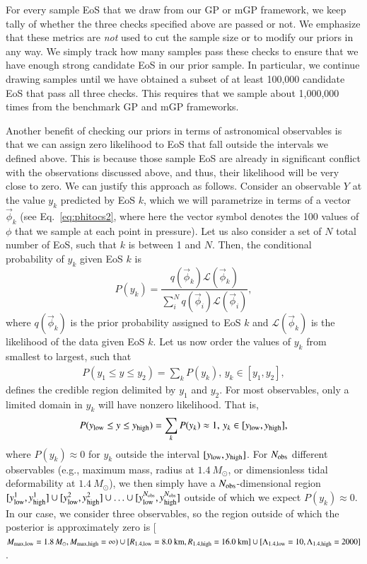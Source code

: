 \documentclass[aps,prd,nofootinbib,tightenlines,notitlepage,floatfix,superscriptaddress,showkeys,twocolumn]{revtex4-1}
\begin{document}
For every sample EoS that we draw from our GP or mGP framework, we keep tally of whether the three checks specified above are passed or not. We emphasize that these metrics are \textit{not} used to cut the sample size or to modify our priors in any way. We simply track how many samples pass these checks to ensure that we have enough strong candidate EoS in our prior sample. In particular, we continue drawing samples until we have obtained a subset of at least 100,000 candidate EoS that pass all three checks. This requires that we sample about 1,000,000 times from the benchmark GP and mGP frameworks.  

Another benefit of checking our priors in terms of astronomical observables is that we can assign zero likelihood to EoS that fall outside the intervals we defined above. This is because those sample EoS are already in significant conflict with the observations discussed above, and thus, their likelihood will be very close to zero. We can justify this approach as follows. Consider an observable $Y$ at the value $y_k$ predicted by EoS $k$, which we will parametrize in terms of a vector $\vec{\phi}_k$ (see Eq.~\eqref{eq:phitocs2}, where here the vector symbol denotes the 100 values of $\phi$ that we sample at each point in pressure). Let us also consider a set of $N$ total number of EoS, such that $k$ is between 1 and $N$. Then, the conditional probability of $y_k$ given EoS $k$ is  
\begin{equation}\label{eq:posterior_obs}
    P(y_k) = \dfrac{q(\vec{\phi}_k)\mathcal{L}(\vec{\phi}_k)}{\sum_i^N q(\vec{\phi}_i)\mathcal{L}(\vec{\phi}_i)},
\end{equation}
where $q(\vec{\phi}_k)$ is the prior probability assigned to EoS $k$ and $\mathcal{L}(\vec{\phi}_k)$ is the likelihood of the data given EoS $k$. Let us now order the values of $y_k$ from smallest to largest, such that 
\begin{eqnarray}
          P(y_1 \leq y \leq y_2) = \sum_k P(y_k), \, y_k\in[y_1,y_2],
\end{eqnarray}
defines the credible region delimited by $y_1$ and $y_2$. For most observables, only a limited domain in $y_k$ will have nonzero likelihood. That is,
\begin{eqnarray}
     P(y_{\rm low} \leq y \leq y_{\rm high}) = \sum_k P(y_k)\approx 1 , \, y_k\in[y_{\rm low},y_{\rm high}],
\end{eqnarray}
where $P(y_k) \approx 0 $ for $y_k$ outside the interval $[y_{\rm low},y_{\rm high}]$. 
For $N_{\rm obs}$ different observables (e.g., maximum mass, radius at $1.4~M_\odot$, or dimensionless tidal deformability at $1.4~M_\odot$), we then simply have a $N_{\rm obs}$-dimensional region $[y_{\rm low}^1,y_{\rm high}^1] \cup [y_{\rm low}^2,y_{\rm high}^2] \cup \ldots \cup [y_{\rm low}^{N_{\rm obs}},y_{\rm high}^{N_{\rm obs}}]$ outside of which we expect $P(y_k) \approx 0 $.  
In our case, we consider three observables, so the region outside of which the posterior is approximately zero is [$M_{\rm max, low} = 1.8 \, M_\odot, M_{\rm max, high} = \infty) \cup  [R_{1.4,{\rm low}} = 8.0 \textrm{ km}, R_{1.4,{\rm high}} = 16.0 \textrm{ km}] \cup [\Lambda_{1.4,{\rm low}} = 10, \Lambda_{1.4,{\rm high}} = 2000]$.
\end{document}
